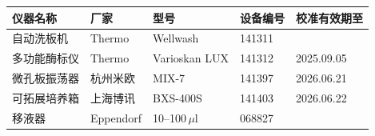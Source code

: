 \documentclass[UTF8,10pt,a4paper,fontset=fandol]{ctexart}
\newcommand{\fieldvalue}[1]{#1}
\newcommand{\handwritten}[1]{#1}
\begin{document}
\small
\begin{tabularx}{\textwidth}{|X|X|X|X|X|}
\hline
仪器名称 & 厂家 & 型号 & 设备编号 & 校准有效期至 \\ \hline
\fieldvalue{自动洗板机} &
\fieldvalue{Thermo} &
\fieldvalue{Wellwash} &
\fieldvalue{\handwritten{141311}} &
\\ \hline
\fieldvalue{多功能酶标仪} &
\fieldvalue{Thermo} &
\fieldvalue{Varioskan LUX} &
\fieldvalue{\handwritten{141312}} &
\fieldvalue{\handwritten{2025.09.05}}
\\ \hline
\fieldvalue{微孔板振荡器} &
\fieldvalue{杭州米欧} &
\fieldvalue{MIX-7} &
\fieldvalue{\handwritten{141397}} &
\fieldvalue{\handwritten{2026.06.21}}
\\ \hline
\fieldvalue{可拓展培养箱} &
\fieldvalue{上海博讯} &
\fieldvalue{BXS-400S} &
\fieldvalue{\handwritten{141403}} &
\fieldvalue{\handwritten{2026.06.22}}
\\ \hline
\fieldvalue{移液器} &
\fieldvalue{Eppendorf} &
\fieldvalue{\handwritten{10--100\,\(\mu\)l}} &
\fieldvalue{\handwritten{068827}} &

\end{tabularx}
\end{document}
